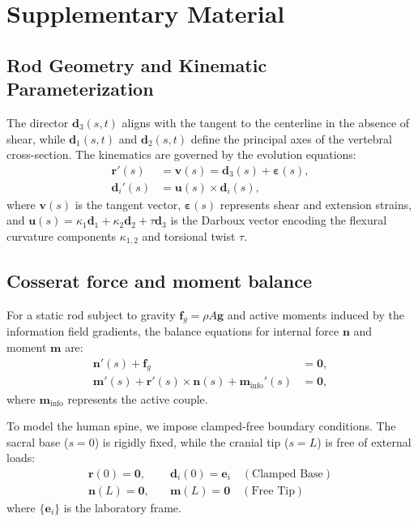 \section*{Supplementary Material}

\setcounter{table}{0}
\renewcommand{\thetable}{S\arabic{table}}

\subsection*{Rod Geometry and Kinematic Parameterization}
The director $\mathbf{d}_3(s,t)$ aligns with the tangent to the centerline in the absence of shear, while $\mathbf{d}_1(s,t)$ and $\mathbf{d}_2(s,t)$ define the principal axes of the vertebral cross-section. The kinematics are governed by the evolution equations:
\begin{align}
\mathbf{r}'(s) &= \mathbf{v}(s) = \mathbf{d}_3(s) + \boldsymbol{\varepsilon}(s), \\
\mathbf{d}_i'(s) &= \mathbf{u}(s) \times \mathbf{d}_i(s),
\label{eq:cosserat_kinematics}
\end{align}
where $\mathbf{v}(s)$ is the tangent vector, $\boldsymbol{\varepsilon}(s)$ represents shear and extension strains, and $\mathbf{u}(s) = \kappa_1 \mathbf{d}_1 + \kappa_2 \mathbf{d}_2 + \tau \mathbf{d}_3$ is the Darboux vector encoding the flexural curvature components $\kappa_{1,2}$ and torsional twist $\tau$.

\subsection*{Cosserat force and moment balance}
For a static rod subject to gravity $\mathbf{f}_g = \rho A \mathbf{g}$ and active moments induced by the information field gradients, the balance equations for internal force $\mathbf{n}$ and moment $\mathbf{m}$ are:
\begin{align}
\mathbf{n}'(s) + \mathbf{f}_g &= \mathbf{0}, \nonumber \\
\mathbf{m}'(s) + \mathbf{r}'(s) \times \mathbf{n}(s) + \mathbf{m}_{\mathrm{info}}'(s) &= \mathbf{0},
\label{eq:cosserat_balance}
\end{align}
where $\mathbf{m}_{\mathrm{info}}$ represents the active couple.

To model the human spine, we impose clamped-free boundary conditions. The sacral base ($s=0$) is rigidly fixed, while the cranial tip ($s=L$) is free of external loads:
\begin{align}
\mathbf{r}(0) = \mathbf{0}, \quad &\mathbf{d}_i(0) = \mathbf{e}_i \quad (\text{Clamped Base}) \nonumber \\
\mathbf{n}(L) = \mathbf{0}, \quad &\mathbf{m}(L) = \mathbf{0} \quad (\text{Free Tip})
\label{eq:boundary_conditions}
\end{align}
where $\{\mathbf{e}_i\}$ is the laboratory frame.

